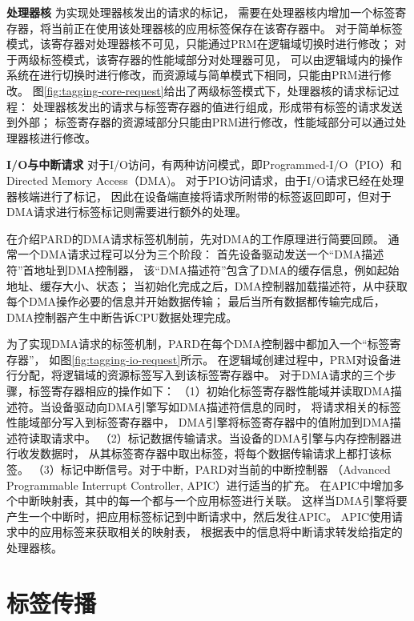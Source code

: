 \textbf{处理器核}\quad
为实现处理器核发出的请求的标记，
需要在处理器核内增加一个标签寄存器，将当前正在使用该处理器核的应用标签保存在该寄存器中。
对于简单标签模式，该寄存器对处理器核不可见，只能通过PRM在逻辑域切换时进行修改；
对于两级标签模式，该寄存器的性能域部分对处理器可见，
可以由逻辑域内的操作系统在进行切换时进行修改，而资源域与简单模式下相同，只能由PRM进行修改。
图\ref{fig:tagging-core-request}给出了两级标签模式下，处理器核的请求标记过程：
处理器核发出的请求与标签寄存器的值进行组成，形成带有标签的请求发送到外部；
标签寄存器的资源域部分只能由PRM进行修改，性能域部分可以通过处理器核进行修改。

\textbf{I/O与中断请求}\quad
对于I/O访问，有两种访问模式，即Programmed-I/O（PIO）和Directed Memory Access（DMA)。
对于PIO访问请求，由于I/O请求已经在处理器核端进行了标记，
因此在设备端直接将请求所附带的标签返回即可，但对于DMA请求进行标签标记则需要进行额外的处理。

在介绍PARD的DMA请求标签机制前，先对DMA的工作原理进行简要回顾。
通常一个DMA请求过程可以分为三个阶段：
首先设备驱动发送一个``DMA描述符''首地址到DMA控制器，
该``DMA描述符''包含了DMA的缓存信息，例如起始地址、缓存大小、状态；
当初始化完成之后，DMA控制器加载描述符，从中获取每个DMA操作必要的信息并开始数据传输；
最后当所有数据都传输完成后，DMA控制器产生中断告诉CPU数据处理完成。

为了实现DMA请求的标签机制，PARD在每个DMA控制器中都加入一个``标签寄存器''，
如图\ref{fig:tagging-io-request}所示。
在逻辑域创建过程中，PRM对设备进行分配，将逻辑域的资源标签写入到该标签寄存器中。
对于DMA请求的三个步骤，标签寄存器相应的操作如下：
（1）初始化标签寄存器性能域并读取DMA描述符。当设备驱动向DMA引擎写如DMA描述符信息的同时，
将请求相关的标签性能域部分写入到标签寄存器中，
DMA引擎将标签寄存器中的值附加到DMA描述符读取请求中。
（2）标记数据传输请求。当设备的DMA引擎与内存控制器进行收发数据时，
从其标签寄存器中取出标签，将每个数据传输请求上都打该标签。
（3）标记中断信号。对于中断，PARD对当前的中断控制器
（Advanced Programmable Interrupt Controller, APIC）进行适当的扩充。
在APIC中增加多个中断映射表，其中的每一个都与一个应用标签进行关联。
这样当DMA引擎将要产生一个中断时，把应用标签标记到中断请求中，然后发往APIC。
APIC使用请求中的应用标签来获取相关的映射表，
根据表中的信息将中断请求转发给指定的处理器核。



\section{标签传播}

